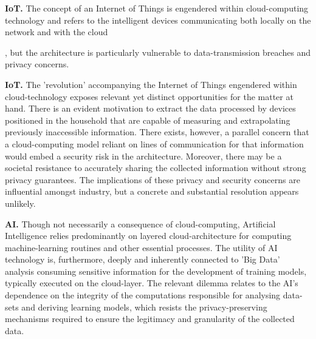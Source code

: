 \documentclass[twocolumn]{scrartcl}
\begin{document}
\textbf{IoT.} The concept of an Internet of Things is engendered within cloud-computing technology and refers to the intelligent devices communicating both locally on the network and with the cloud 

, but the architecture is particularly vulnerable to data-transmission breaches and privacy concerns. 

\textbf{IoT.} The 'revolution' accompanying the Internet of Things engendered within cloud-technology exposes relevant yet distinct opportunities for the matter at hand. There is an evident motivation to extract the data processed by devices positioned in the household that are capable of measuring and extrapolating previously inaccessible information. There exists, however, a parallel concern that a cloud-computing model reliant on lines of communication for that information would embed a security risk in the architecture. Moreover, there may be a societal resistance to accurately sharing the collected information without strong privacy guarantees. The implications of these privacy and security concerns are influential amongst industry, but a concrete and substantial resolution appears unlikely.

\textbf{AI.} Though not necessarily a consequence of cloud-computing, Artificial Intelligence relies predominantly on layered cloud-architecture for computing machine-learning routines and other essential processes. The utility of AI technology is, furthermore, deeply and inherently connected to 'Big Data' analysis consuming sensitive information for the development of training models, typically executed on the cloud-layer. The relevant dilemma relates to the AI's dependence on the integrity of the computations responsible for analysing data-sets and deriving learning models, which resists the privacy-preserving mechanisms required to ensure the legitimacy and granularity of the collected data.
\end{document}
